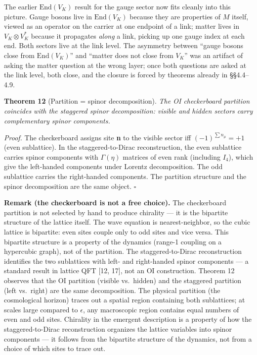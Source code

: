 \documentclass[
]{article}
\begin{document}
The earlier \(\mathrm{End}(V_K)\) result for the gauge sector now fits
cleanly into this picture. Gauge bosons live in \(\mathrm{End}(V_K)\)
because they are properties of \(M\) itself, viewed as an operator on
the carrier at one endpoint of a link; matter lives in
\(V_K \otimes V_K^*\) because it propagates \emph{along} a link, picking
up one gauge index at each end. Both sectors live at the link level. The
asymmetry between ``gauge bosons close from \(\mathrm{End}(V_K)\)'' and
``matter does not close from \(V_K\)'' was an artifact of asking the
matter question at the wrong layer; once both questions are asked at the
link level, both close, and the closure is forced by theorems already in
§§4.4--4.9.

\textbf{Theorem 12} (Partition = spinor decomposition). \emph{The OI
checkerboard partition coincides with the staggered spinor
decomposition: visible and hidden sectors carry complementary spinor
components.}

\emph{Proof.} The checkerboard assigns site \textbf{n} to the visible
sector iff \((-1)^{\sum n_\mu} = +1\) (even sublattice). In the
staggered-to-Dirac reconstruction, the even sublattice carries spinor
components with \(\Gamma(\eta)\) matrices of even rank (including
\(I_4\)), which give the left-handed components under Lorentz
decomposition. The odd sublattice carries the right-handed components.
The partition structure and the spinor decomposition are the same
object. \(\square\)

\textbf{Remark (the checkerboard is not a free choice).} The
checkerboard partition is not selected by hand to produce chirality ---
it is the bipartite structure of the lattice itself. The wave equation
is nearest-neighbor, so the cubic lattice is bipartite: even sites
couple only to odd sites and vice versa. This bipartite structure is a
property of the dynamics (range-1 coupling on a hypercubic graph), not
of the partition. The staggered-to-Dirac reconstruction identifies the
two sublattices with left- and right-handed spinor components --- a
standard result in lattice QFT {[}12, 17{]}, not an OI construction.
Theorem 12 observes that the OI partition (visible vs.~hidden) and the
staggered partition (left vs.~right) are the same decomposition. The
physical partition (the cosmological horizon) traces out a spatial
region containing both sublattices; at scales large compared to
\(\epsilon\), any macroscopic region contains equal numbers of even and
odd sites. Chirality in the emergent description is a property of how
the staggered-to-Dirac reconstruction organizes the lattice variables
into spinor components --- it follows from the bipartite structure of
the dynamics, not from a choice of which sites to trace out.
\end{document}
